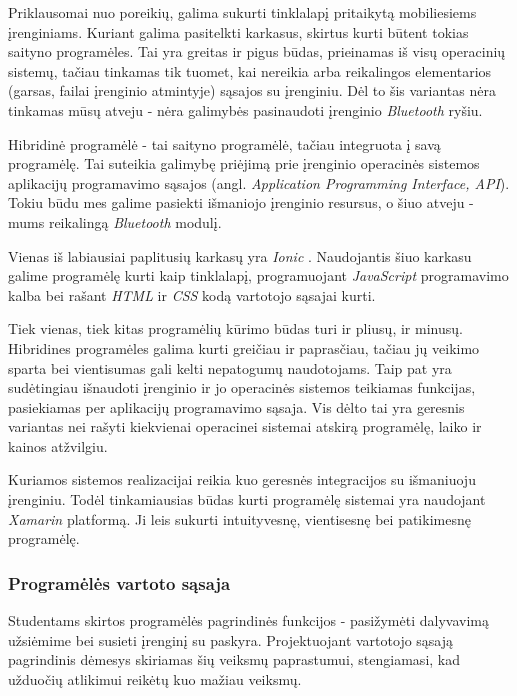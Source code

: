 \documentclass{VUMIFPSkursinis}
\begin{document}
 \label{webApp}

Priklausomai nuo poreikių, galima sukurti tinklalapį pritaikytą mobiliesiems įrenginiams. Kuriant galima pasitelkti karkasus, skirtus kurti būtent tokias saityno programėles. Tai yra greitas ir pigus būdas, prieinamas iš visų operacinių sistemų, tačiau tinkamas tik tuomet, kai nereikia arba reikalingos elementarios (garsas, failai įrenginio atmintyje) sąsajos su įrenginiu. Dėl to šis variantas nėra tinkamas mūsų atveju - nėra galimybės pasinaudoti įrenginio \textit{Bluetooth} ryšiu.


Hibridinė programėlė - tai saityno programėlė, tačiau integruota į 	savą programėlę. Tai suteikia galimybę priėjimą prie įrenginio operacinės sistemos aplikacijų programavimo sąsajos (angl. \textit{Application Programming Interface, API}). Tokiu būdu mes galime pasiekti išmaniojo įrenginio resursus, o šiuo atveju - mums reikalingą \textit{Bluetooth} modulį.

Vienas iš labiausiai paplitusių karkasų yra \textit{Ionic} \cite{hybridFrameworks}. Naudojantis šiuo karkasu galime programėlę kurti kaip tinklalapį, programuojant \textit{JavaScript} programavimo kalba bei rašant \textit{HTML} ir \textit{CSS} kodą vartotojo sąsajai kurti.


Tiek vienas, tiek kitas programėlių kūrimo būdas turi ir pliusų, ir minusų. Hibridines programėles galima kurti greičiau ir paprasčiau, tačiau jų veikimo sparta bei vientisumas gali kelti nepatogumų naudotojams. Taip pat yra sudėtingiau išnaudoti įrenginio ir jo operacinės sistemos teikiamas funkcijas, pasiekiamas per aplikacijų programavimo sąsaja. Vis dėlto tai yra geresnis variantas nei rašyti kiekvienai operacinei sistemai atskirą programėlę, laiko ir kainos atžvilgiu.

Kuriamos sistemos realizacijai reikia kuo geresnės integracijos su išmaniuoju įrenginiu. Todėl tinkamiausias būdas kurti programėlę sistemai yra naudojant \textit{Xamarin} platformą. Ji leis sukurti intuityvesnę, vientisesnę bei patikimesnę programėlę.

\subsubsection{Programėlės vartoto sąsaja}

Studentams skirtos programėlės pagrindinės funkcijos - pasižymėti dalyvavimą užsiėmime bei susieti įrenginį su paskyra. Projektuojant vartotojo sąsają pagrindinis dėmesys skiriamas šių veiksmų paprastumui, stengiamasi, kad užduočių atlikimui reikėtų kuo mažiau veiksmų.
\end{document}

